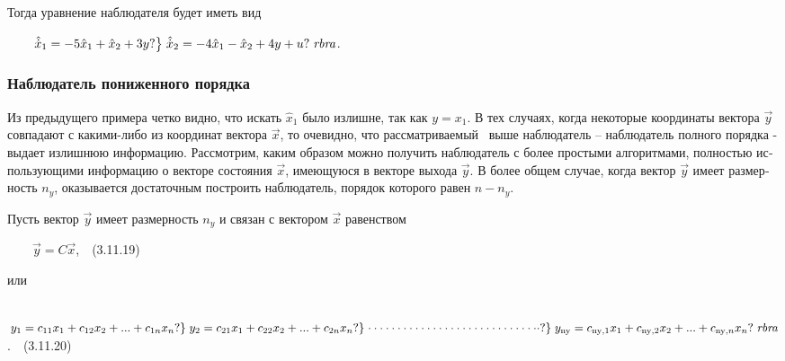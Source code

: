 \documentclass[a4paper]{article}
\newcommand\normalsubformula[1]{\text{\mathversion{normal}$#1$}}
\begin{document}
{\begin{russian}\sffamily
Тогда уравнение наблюдателя будет иметь вид
\end{russian}}

{\begin{russian}\sffamily
\ \ \ \  $\begin{matrix}\left.\hat{\dot x}_1=-5\hat x_1+\hat x_2+3y?\right\}\left.\hat{\dot x}_2=-4\hat x_1-\hat
x_2+4y+u?\right.\mathit{rbra}\hfill\null \end{matrix}$.
\end{russian}}


\bigskip

\subsubsection{Наблюдатель пониженного порядка}
\hypertarget{RefHeadingToc455659751}{}
\bigskip

{\begin{russian}\sffamily
Из предыдущего примера четко видно, что искать  $\hat x_1$ было излишне, так как  $y=x_1$. В тех случаях, когда
некоторые координаты вектора  $\vec y$ совпадают с какими-либо из координат вектора  $\vec x$, то очевидно, что
рассматриваемый \ выше наблюдатель – наблюдатель полного порядка - выдает излишнюю информацию. Рассмотрим, каким
образом можно получить наблюдатель с более простыми алгоритмами, полностью использующими информацию о векторе состояния
 $\vec x$, имеющуюся в векторе выхода  $\vec y$. В более общем случае, когда вектор  $\vec y$ имеет размерность  $n_y$,
оказывается достаточным построить наблюдатель, порядок которого равен  $n-n_y$.
\end{russian}}

{\begin{russian}\sffamily
Пусть вектор  $\vec y$ имеет размерность  $n_y$ и связан с вектором  $\vec x$ равенством
\end{russian}}

{\begin{russian}\sffamily
\ \ \ \   $\vec y=C\vec x$,\ \ (3.11.19)
\end{russian}}

{\begin{russian}\sffamily
или
\end{russian}}


\bigskip

{\begin{russian}\sffamily
\ \ 
$\begin{matrix}\left.y_1=c_{11}x_1+c_{12}x_2+...+c_{1n}x_n?\right\}\left.y_2=c_{21}x_1+c_{22}x_2+...+c_{2n}x_n?\right\}\left.\cdot
\cdot \cdot \cdot \cdot \cdot \cdot \cdot \cdot \cdot \cdot \cdot \cdot \cdot \cdot \cdot \cdot \cdot \cdot \cdot \cdot
\cdot \cdot \cdot \cdot \cdot \cdot \cdot \cdot \cdot
?\right\}\left.y_{\normalsubformula{\text{ny}}}=c_{\normalsubformula{\text{ny}},1}x_1+c_{\normalsubformula{\text{ny}},2}x_2+...+c_{\normalsubformula{\text{ny}},n}x_n?\right.\mathit{rbra}\hfill\null
\end{matrix}$.\ \ (3.11.20)
\end{russian}}
\end{document}
